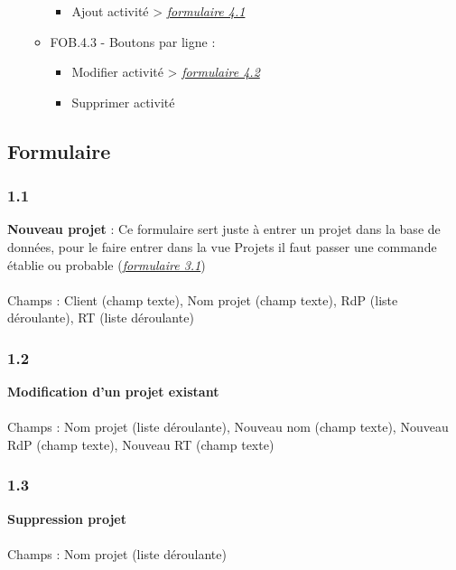 \documentclass[french]{report}
\begin{document}
\begin{itemize}[label=\textbullet, font=\normalfont \color{blue}]
\begin{itemize}[label=\textbullet]
  \begin{itemize}[label=-]
    \item{Ajout activité} > \hyperref[sec:4.1]{\emph{formulaire 4.1}}
  \end{itemize}

  \item{FOB.4.3 - Boutons par ligne :}

  \begin{itemize}[label=-]
    \item{Modifier activité} > \hyperref[sec:4.2]{\emph{formulaire 4.2}}
    \item{Supprimer activité}

  \end{itemize}

\end{itemize}

\end{itemize}

\subsection{Formulaire}

\subsubsection{1.1}
\label{sec:1.1}
\textbf{Nouveau projet} : Ce formulaire sert juste à entrer un projet dans la base de
données, pour le faire entrer dans la vue Projets il faut passer une commande
établie ou probable (\hyperref[sec:3.1]{\emph{formulaire 3.1}})
\\\\ Champs : Client (champ texte), Nom projet (champ texte), RdP (liste
déroulante), RT (liste déroulante)

\subsubsection{1.2}
\label{sec:1.2}
\textbf{Modification d’un projet existant}\\\\ Champs : Nom projet (liste déroulante),
Nouveau nom (champ texte), Nouveau RdP (champ texte), Nouveau RT (champ texte)

\subsubsection{1.3}
\label{sec:1.3}
\textbf{Suppression projet}\\\\
Champs : Nom projet (liste déroulante)
\end{document}
